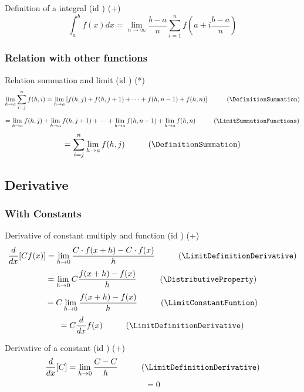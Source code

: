 \documentclass{book}
\begin{document}
                    Definition of a integral (id \DefinitionIntegral) (+)
                    \[\int^b_a f(x) dx = \lim_{n \rightarrow \infty} \frac{b - a}{n} \sum^n_{i=1} f\left(a + i \frac{b - a}{n}\right)\]

                \subsubsection{Relation with other functions}
                    Relation summation and limit (id \RelationSummationLimit) (*)
                    \[\lim_{h \rightarrow a} \sum^{n}_{i=j} f(h, i) = \lim_{h \rightarrow a} \left[f(h, j) + f(h, j + 1) + \cdots + f(h, n - 1) + f(h, n)\right] \hspace{1cm} (\DefinitionSummation)\]
                    \[= \lim_{h \rightarrow a} f(h, j) + \lim_{h \rightarrow a} f(h, j + 1) + \cdots + \lim_{h \rightarrow a} f(h, n - 1) + \lim_{h \rightarrow a} f(h, n) \hspace{1cm} (\LimitSummationFunctions)\]
                    \[= \sum^n_{i=j} \lim_{h \rightarrow a} f(h, j) \hspace{1cm} (\DefinitionSummation)\]
        
            \subsection{Derivative}
                \subsubsection{With Constants}
                    Derivative of constant multiply and function (id \DerivativeConstantMultiply) (+)
                    \[\frac{d}{dx} [C f(x)] = \lim_{h \rightarrow 0} \frac{C \cdot f(x + h) - C \cdot f(x)}{h} \hspace{1cm} (\LimitDefinitionDerivative)\]
                    \[= \lim_{h \rightarrow 0} C \frac{f(x + h) - f(x)}{h} \hspace{1cm} (\DistributiveProperty)\]
                    \[= C \lim_{h \rightarrow 0} \frac{f(x + h) - f(x)}{h} \hspace{1cm} (\LimitConstantFuntion)\]
                    \[= C \frac{d}{dx} f(x) \hspace{1cm} (\LimitDefinitionDerivative)\]

                    Derivative of a constant (id \DerivativeConstant) (+)
                    \[\frac{d}{dx} [C] = \lim_{h \rightarrow 0} \frac{C - C}{h} \hspace{1cm} (\LimitDefinitionDerivative)\]
                    \[= 0\]
\end{document}
